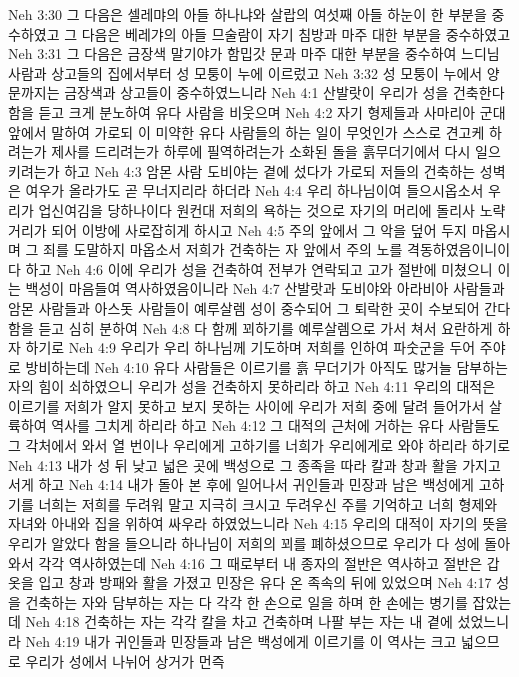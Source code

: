 Neh 3:30  그 다음은 셀레먀의 아들 하나냐와 살랍의 여섯째 아들 하눈이 한 부분을 중수하였고 그 다음은 베레갸의 아들 므술람이 자기 침방과 마주 대한 부분을 중수하였고
Neh 3:31  그 다음은 금장색 말기야가 함밉갓 문과 마주 대한 부분을 중수하여 느디님 사람과 상고들의 집에서부터 성 모퉁이 누에 이르렀고
Neh 3:32  성 모퉁이 누에서 양문까지는 금장색과 상고들이 중수하였느니라
Neh 4:1  산발랏이 우리가 성을 건축한다 함을 듣고 크게 분노하여 유다 사람을 비웃으며
Neh 4:2  자기 형제들과 사마리아 군대 앞에서 말하여 가로되 이 미약한 유다 사람들의 하는 일이 무엇인가 스스로 견고케 하려는가 제사를 드리려는가 하루에 필역하려는가 소화된 돌을 흙무더기에서 다시 일으키려는가 하고
Neh 4:3  암몬 사람 도비야는 곁에 섰다가 가로되 저들의 건축하는 성벽은 여우가 올라가도 곧 무너지리라 하더라
Neh 4:4  우리 하나님이여 들으시옵소서 우리가 업신여김을 당하나이다 원컨대 저희의 욕하는 것으로 자기의 머리에 돌리사 노략거리가 되어 이방에 사로잡히게 하시고
Neh 4:5  주의 앞에서 그 악을 덮어 두지 마옵시며 그 죄를 도말하지 마옵소서 저희가 건축하는 자 앞에서 주의 노를 격동하였음이니이다 하고
Neh 4:6  이에 우리가 성을 건축하여 전부가 연락되고 고가 절반에 미쳤으니 이는 백성이 마음들여 역사하였음이니라
Neh 4:7  산발랏과 도비야와 아라비아 사람들과 암몬 사람들과 아스돗 사람들이 예루살렘 성이 중수되어 그 퇴락한 곳이 수보되어 간다 함을 듣고 심히 분하여
Neh 4:8  다 함께 꾀하기를 예루살렘으로 가서 쳐서 요란하게 하자 하기로
Neh 4:9  우리가 우리 하나님께 기도하며 저희를 인하여 파숫군을 두어 주야로 방비하는데
Neh 4:10  유다 사람들은 이르기를 흙 무더기가 아직도 많거늘 담부하는 자의 힘이 쇠하였으니 우리가 성을 건축하지 못하리라 하고
Neh 4:11  우리의 대적은 이르기를 저희가 알지 못하고 보지 못하는 사이에 우리가 저희 중에 달려 들어가서 살륙하여 역사를 그치게 하리라 하고
Neh 4:12  그 대적의 근처에 거하는 유다 사람들도 그 각처에서 와서 열 번이나 우리에게 고하기를 너희가 우리에게로 와야 하리라 하기로
Neh 4:13  내가 성 뒤 낮고 넓은 곳에 백성으로 그 종족을 따라 칼과 창과 활을 가지고 서게 하고
Neh 4:14  내가 돌아 본 후에 일어나서 귀인들과 민장과 남은 백성에게 고하기를 너희는 저희를 두려워 말고 지극히 크시고 두려우신 주를 기억하고 너희 형제와 자녀와 아내와 집을 위하여 싸우라 하였었느니라
Neh 4:15  우리의 대적이 자기의 뜻을 우리가 알았다 함을 들으니라 하나님이 저희의 꾀를 폐하셨으므로 우리가 다 성에 돌아와서 각각 역사하였는데
Neh 4:16  그 때로부터 내 종자의 절반은 역사하고 절반은 갑옷을 입고 창과 방패와 활을 가졌고 민장은 유다 온 족속의 뒤에 있었으며
Neh 4:17  성을 건축하는 자와 담부하는 자는 다 각각 한 손으로 일을 하며 한 손에는 병기를 잡았는데
Neh 4:18  건축하는 자는 각각 칼을 차고 건축하며 나팔 부는 자는 내 곁에 섰었느니라
Neh 4:19  내가 귀인들과 민장들과 남은 백성에게 이르기를 이 역사는 크고 넓으므로 우리가 성에서 나뉘어 상거가 먼즉
